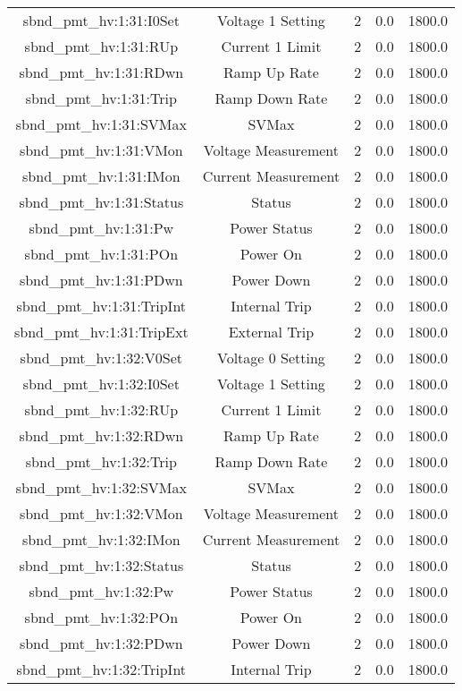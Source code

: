 \begin{table}[ptb]
\begin{tabular}{c | c c c c}
sbnd_pmt_hv:1:31:I0Set & Voltage 1 Setting & 2 & 0.0 & 1800.0\\ 
sbnd_pmt_hv:1:31:RUp & Current 1 Limit & 2 & 0.0 & 1800.0\\ 
sbnd_pmt_hv:1:31:RDwn & Ramp Up Rate & 2 & 0.0 & 1800.0\\ 
sbnd_pmt_hv:1:31:Trip & Ramp Down Rate & 2 & 0.0 & 1800.0\\ 
sbnd_pmt_hv:1:31:SVMax & SVMax & 2 & 0.0 & 1800.0\\ 
sbnd_pmt_hv:1:31:VMon & Voltage Measurement & 2 & 0.0 & 1800.0\\ 
sbnd_pmt_hv:1:31:IMon & Current Measurement & 2 & 0.0 & 1800.0\\ 
sbnd_pmt_hv:1:31:Status & Status & 2 & 0.0 & 1800.0\\ 
sbnd_pmt_hv:1:31:Pw & Power Status & 2 & 0.0 & 1800.0\\ 
sbnd_pmt_hv:1:31:POn & Power On & 2 & 0.0 & 1800.0\\ 
sbnd_pmt_hv:1:31:PDwn & Power Down & 2 & 0.0 & 1800.0\\ 
sbnd_pmt_hv:1:31:TripInt & Internal Trip & 2 & 0.0 & 1800.0\\ 
sbnd_pmt_hv:1:31:TripExt & External Trip & 2 & 0.0 & 1800.0\\ 
sbnd_pmt_hv:1:32:V0Set & Voltage 0 Setting & 2 & 0.0 & 1800.0\\ 
sbnd_pmt_hv:1:32:I0Set & Voltage 1 Setting & 2 & 0.0 & 1800.0\\ 
sbnd_pmt_hv:1:32:RUp & Current 1 Limit & 2 & 0.0 & 1800.0\\ 
sbnd_pmt_hv:1:32:RDwn & Ramp Up Rate & 2 & 0.0 & 1800.0\\ 
sbnd_pmt_hv:1:32:Trip & Ramp Down Rate & 2 & 0.0 & 1800.0\\ 
sbnd_pmt_hv:1:32:SVMax & SVMax & 2 & 0.0 & 1800.0\\ 
sbnd_pmt_hv:1:32:VMon & Voltage Measurement & 2 & 0.0 & 1800.0\\ 
sbnd_pmt_hv:1:32:IMon & Current Measurement & 2 & 0.0 & 1800.0\\ 
sbnd_pmt_hv:1:32:Status & Status & 2 & 0.0 & 1800.0\\ 
sbnd_pmt_hv:1:32:Pw & Power Status & 2 & 0.0 & 1800.0\\ 
sbnd_pmt_hv:1:32:POn & Power On & 2 & 0.0 & 1800.0\\ 
sbnd_pmt_hv:1:32:PDwn & Power Down & 2 & 0.0 & 1800.0\\ 
sbnd_pmt_hv:1:32:TripInt & Internal Trip & 2 & 0.0 & 1800.0\\ 

\end{tabular}
\end{table}
